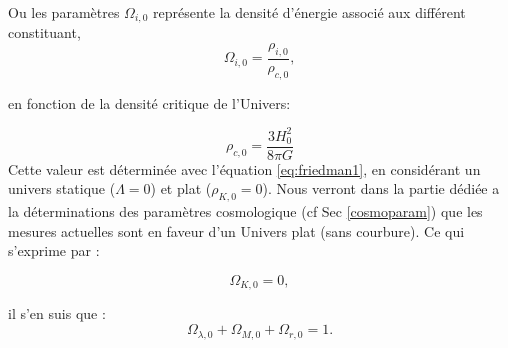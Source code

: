 Ou les paramètres $\Omega_{i,0}$ représente la densité d'énergie associé aux différent constituant, 
\begin{equation}
 \Omega_{i,0} = \frac{\rho_{i,0}}{\rho_{c,0}},
 \end{equation}

en fonction de la densité critique de l'Univers:

\begin{equation}
\rho_{c,0} = \frac{3H_0^2}{8\pi G}
 \end{equation}
Cette valeur est déterminée avec l'équation \ref{eq:friedman1}, en considérant un univers statique ($\Lambda=0$) et plat ($\rho_{K,0}=0$).
Nous verront dans la partie dédiée a la déterminations des paramètres cosmologique (cf Sec \ref{cosmoparam}) que les mesures actuelles sont en faveur d'un Univers plat (sans courbure).
Ce qui s'exprime par :

\begin{equation}
\Omega_{K,0} = 0,
\end{equation}

il s'en suis que :
\begin{equation}
\Omega_{\lambda,0} +  \Omega_{M,0} + \Omega_{r,0} =1 .
\end{equation}



